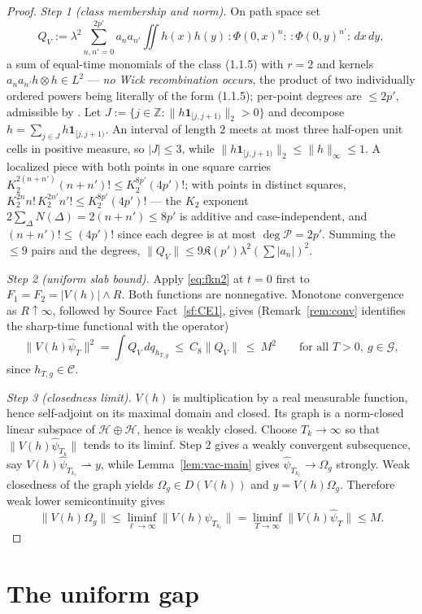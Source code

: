 \documentclass[11pt,a4paper]{article}
\theoremstyle{plain}
\theoremstyle{definition}
\newcommand{\Z}{\mathbb{Z}}
\newcommand{\G}{\mathcal{G}}
\newcommand{\HH}{\mathcal{H}}
\newcommand{\Om}{\Omega}
\begin{document}
\begin{proof}
\emph{Step 1 (class membership and norm).} On path space set
\[
  Q_V:=\lambda^2\!\!\sum_{n,n'=0}^{2p'}\!\!a_na_{n'}\iint h(x)h(y)\,
  {:}\Phi(0,x)^n{:}\,{:}\Phi(0,y)^{n'}{:}\,dx\,dy ,
\]
a sum of equal-time monomials of the class (1.1.5) with $r=2$ and kernels
$a_na_{n'}h\otimes h\in L^2$ --- \emph{no Wick recombination occurs}, the product of two
individually ordered powers being literally of the form (1.1.5); per-point degrees are
$\le2p'$, admissible by \cite[fn.~9]{GJS}. Let
$J:=\{j\in\Z:\|h\mathbf1_{[j,j+1)}\|_2>0\}$ and decompose
$h=\sum_{j\in J}h\mathbf1_{[j,j+1)}$. An interval of length $2$ meets at most three half-open
unit cells in positive measure, so $|J|\le3$, while
$\|h\mathbf1_{[j,j+1)}\|_2\le\|h\|_\infty\le1$. A localized piece with both points in one square carries
$K_2^{2(n+n')}(n+n')!\le K_2^{8p'}(4p')!$; with points in distinct squares,
$K_2^{2n}n!\,K_2^{2n'}n'!\le K_2^{8p'}(4p')!$ --- the $K_2$ exponent $2\sum_\Delta N(\Delta)
=2(n+n')\le8p'$ is additive and case-independent, and $(n+n')!\le(4p')!$ since each degree is
at most $\deg\mathscr P=2p'$. Summing the $\le9$ pairs and the degrees,
$\|Q_V\|\le9\mathfrak K(p')\lambda^2(\sum|a_n|)^2$.

\emph{Step 2 (uniform slab bound).} Apply \eqref{eq:fkn2} at $t=0$ first to
$F_1=F_2=|V(h)|\wedge R$. Both functions are nonnegative. Monotone convergence as
$R\uparrow\infty$, followed by Source Fact~\ref{sf:CE1}, gives
(Remark~\ref{rem:conv} identifies the sharp-time functional with the operator)
\[
  \|V(h)\hat\psi_T\|^2=\int Q_V\,dq_{h_{T,g}}\ \le\ C_8\|Q_V\|\ \le\ M^2
  \qquad\text{for all }T>0,\ g\in\G ,
\]
since $h_{T,g}\in\mathcal C$.

\emph{Step 3 (closedness limit).} $V(h)$ is multiplication by a real measurable function,
hence self-adjoint on its maximal domain and closed. Its graph is a norm-closed linear subspace
of $\HH\oplus\HH$, hence is weakly closed. Choose $T_k\to\infty$ so that
$\|V(h)\hat\psi_{T_k}\|$ tends to its liminf. Step 2 gives a weakly convergent subsequence,
say $V(h)\hat\psi_{T_{k_\ell}}\rightharpoonup y$, while
Lemma~\ref{lem:vac-main} gives $\hat\psi_{T_{k_\ell}}\to\Om_g$ strongly. Weak closedness of the
graph yields $\Om_g\in D(V(h))$ and $y=V(h)\Om_g$. Therefore weak lower semicontinuity gives
\[
 \|V(h)\Om_g\|\le\liminf_{\ell\to\infty}
 \|V(h)\hat\psi_{T_{k_\ell}}\|
 =\liminf_{T\to\infty}\|V(h)\hat\psi_T\|\le M.
\]
\end{proof}

\section{The uniform gap}\label{sec:G}
\end{document}

